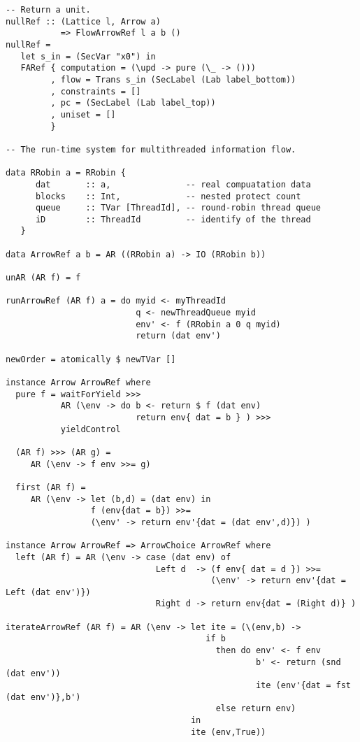 \begin{Verbatim}[fontsize=\footnotesize,frame=lines,
                 framesep=5mm, label={[FlowArrowRef.hs]FlowArrowRef.hs}]
-- Return a unit.
nullRef :: (Lattice l, Arrow a) 
           => FlowArrowRef l a b ()
nullRef =
   let s_in = (SecVar "x0") in
   FARef { computation = (\upd -> pure (\_ -> ()))
         , flow = Trans s_in (SecLabel (Lab label_bottom))
         , constraints = []
         , pc = (SecLabel (Lab label_top))
         , uniset = []
         }

-- The run-time system for multithreaded information flow.

data RRobin a = RRobin {
      dat       :: a,               -- real compuatation data
      blocks    :: Int,             -- nested protect count
      queue     :: TVar [ThreadId], -- round-robin thread queue
      iD        :: ThreadId         -- identify of the thread
   }

data ArrowRef a b = AR ((RRobin a) -> IO (RRobin b)) 

unAR (AR f) = f

runArrowRef (AR f) a = do myid <- myThreadId
                          q <- newThreadQueue myid
                          env' <- f (RRobin a 0 q myid)
                          return (dat env')

newOrder = atomically $ newTVar []

instance Arrow ArrowRef where
  pure f = waitForYield >>>
           AR (\env -> do b <- return $ f (dat env)
                          return env{ dat = b } ) >>>
           yieldControl
              
  (AR f) >>> (AR g) =
     AR (\env -> f env >>= g)

  first (AR f) =
     AR (\env -> let (b,d) = (dat env) in
                 f (env{dat = b}) >>=
                 (\env' -> return env'{dat = (dat env',d)}) )

instance Arrow ArrowRef => ArrowChoice ArrowRef where
  left (AR f) = AR (\env -> case (dat env) of
                              Left d  -> (f env{ dat = d }) >>= 
                                         (\env' -> return env'{dat = Left (dat env')})
                              Right d -> return env{dat = (Right d)} )

iterateArrowRef (AR f) = AR (\env -> let ite = (\(env,b) -> 
                                        if b
                                          then do env' <- f env
                                                  b' <- return (snd (dat env'))
                                                  ite (env'{dat = fst (dat env')},b')
                                          else return env)
                                     in
                                     ite (env,True))


\end{Verbatim}
